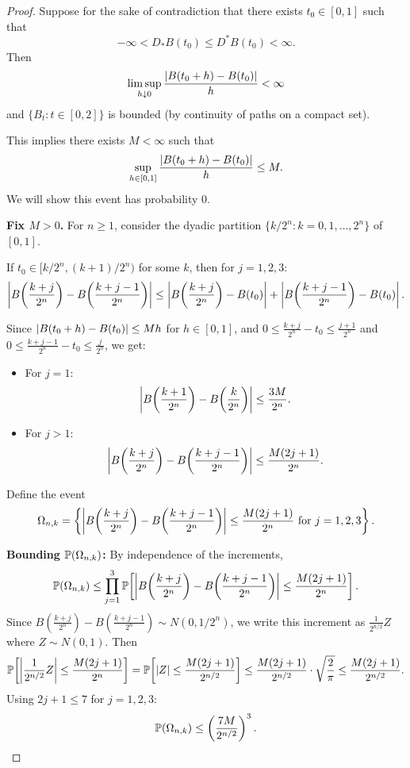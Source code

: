 \begin{proof}
    Suppose for the sake of contradiction that there exists $t_0 \in [0,1]$ such that
    \[
        -\infty < D_* B(t_0) \leq D^* B(t_0) < \infty.
    \]
    Then
    \[
        \limsup_{h \downarrow 0} \frac{\left|B(t_0 + h) - B(t_0)\right|}{h} < \infty
    \]
    and $\{B_t : t \in [0,2]\}$ is bounded (by continuity of paths on a compact set).

    This implies there exists $M < \infty$ such that
    \[
        \sup_{h \in [0,1]} \frac{\left|B(t_0 + h) - B(t_0)\right|}{h} \leq M.
    \]
    We will show this event has probability $0$.

    \medskip
    \textbf{Fix $M > 0$.} For $n \geq 1$, consider the dyadic partition $\{k/2^n : k = 0, 1, \ldots, 2^n\}$ of $[0,1]$.

    If $t_0 \in [k/2^n, (k+1)/2^n)$ for some $k$, then for $j = 1, 2, 3$:
    \[
        \left|B\!\left(\frac{k+j}{2^n}\right) - B\!\left(\frac{k+j-1}{2^n}\right)\right|
        \leq \left|B\!\left(\frac{k+j}{2^n}\right) - B(t_0)\right| + \left|B\!\left(\frac{k+j-1}{2^n}\right) - B(t_0)\right|.
    \]

    Since $\left|B(t_0 + h) - B(t_0)\right| \leq M h$ for $h \in [0,1]$, and $0 \leq \frac{k+j}{2^n} - t_0 \leq \frac{j+1}{2^n}$ and $0 \leq \frac{k+j-1}{2^n} - t_0 \leq \frac{j}{2^n}$, we get:
    \begin{itemize}
        \item For $j = 1$:
        \[
            \left|B\!\left(\frac{k+1}{2^n}\right) - B\!\left(\frac{k}{2^n}\right)\right| \leq \frac{3M}{2^n}.
        \]
        \item For $j > 1$:
        \[
            \left|B\!\left(\frac{k+j}{2^n}\right) - B\!\left(\frac{k+j-1}{2^n}\right)\right| \leq \frac{M(2j+1)}{2^n}.
        \]
    \end{itemize}

    Define the event
    \[
        \Omega_{n,k} = \left\{ \left|B\!\left(\frac{k+j}{2^n}\right) - B\!\left(\frac{k+j-1}{2^n}\right)\right| \leq \frac{M(2j+1)}{2^n} \text{ for } j = 1, 2, 3 \right\}.
    \]

    \textbf{Bounding $\mathbb{P}(\Omega_{n,k})$:} By independence of the increments,
    \[
        \mathbb{P}(\Omega_{n,k}) \leq \prod_{j=1}^{3} \mathbb{P}\!\left[\left|B\!\left(\frac{k+j}{2^n}\right) - B\!\left(\frac{k+j-1}{2^n}\right)\right| \leq \frac{M(2j+1)}{2^n}\right].
    \]
    Since $B\!\left(\frac{k+j}{2^n}\right) - B\!\left(\frac{k+j-1}{2^n}\right) \sim N(0, 1/2^n)$, we write this increment as $\frac{1}{2^{n/2}} Z$ where $Z \sim N(0,1)$. Then
    \[
        \mathbb{P}\!\left[\left|\frac{1}{2^{n/2}} Z\right| \leq \frac{M(2j+1)}{2^n}\right]
        = \mathbb{P}\!\left[\left|Z\right| \leq \frac{M(2j+1)}{2^{n/2}}\right]
        \leq \frac{M(2j+1)}{2^{n/2}} \cdot \sqrt{\frac{2}{\pi}} \leq \frac{M(2j+1)}{2^{n/2}}.
    \]
    Using $2j+1 \leq 7$ for $j = 1,2,3$:
    \[
        \mathbb{P}(\Omega_{n,k}) \leq \left(\frac{7M}{2^{n/2}}\right)^3.
    \]


\end{proof}
